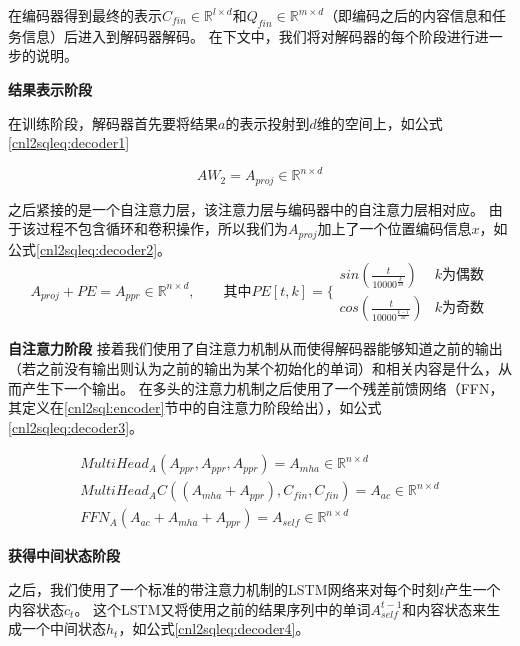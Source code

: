 在编码器得到最终的表示$C_{fin} \in \mathbb{R}^{l \times d}$和$Q_{fin} \in \mathbb{R}^{m \times d}$（即编码之后的内容信息和任务信息）后进入到解码器解码。
在下文中，我们将对解码器的每个阶段进行进一步的说明。

\textbf{结果表示阶段}

在训练阶段，解码器首先要将结果$a$的表示投射到$d$维的空间上，如公式\ref{cnl2sqleq:decoder1}

\begin{equation}
  \label{cnl2sqleq:decoder1}
  AW_2 = A_{proj} \in \mathbb{R}^{n \times d} 
\end{equation}

之后紧接的是一个自注意力层，该注意力层与编码器中的自注意力层相对应。
由于该过程不包含循环和卷积操作，所以我们为$A_{proj}$加上了一个位置编码信息$x$，如公式\ref{cnl2sqleq:decoder2}。
\begin{equation}
  \label{cnl2sqleq:decoder2}
  A_{proj} + PE = A_{ppr} \in \mathbb{R}^{n \times d},\qquad \mbox{其中} PE[t,k] = \{   
  \begin{array}{lr}
    sin(\frac{t}{10000^{\frac{k}{2d}}}) &  k\mbox{为偶数}\\
    cos(\frac{t}{10000^{\frac{k-1}{2d}}}) &  k\mbox{为奇数}
  \end{array}
\end{equation}

\textbf{自注意力阶段}
接着我们使用了自注意力机制\cite{vaswani2017attention}从而使得解码器能够知道之前的输出（若之前没有输出则认为之前的输出为某个初始化的单词）和相关内容是什么，从而产生下一个输出。
在多头的注意力机制之后使用了一个残差前馈网络（FFN，其定义在\ref{cnl2sql:encoder}节中的自注意力阶段给出），如公式\ref{cnl2sqleq:decoder3}。

\begin{gather}
  \label{cnl2sqleq:decoder3}
  MultiHead_A(A_{ppr},A_{ppr},A_{ppr}) = A_{mha} \in \mathbb{R}^{n \times d}\\
  MultiHead_{A}C((A_{mha} + A_{ppr}),C_{fin},C_{fin}) = A_{ac} \in \mathbb{R}^{n \times d}\\
  FFN_A(A_{ac} + A_{mha} + A_{ppr}) = A_{self} \in \mathbb{R}^{n \times d}
\end{gather}

\textbf{获得中间状态阶段}

之后，我们使用了一个标准的带注意力机制的LSTM网络来对每个时刻$t$产生一个内容状态$\widetilde{c}_t$。
这个LSTM又将使用之前的结果序列中的单词$A^{t-1}_{self}$和内容状态来生成一个中间状态$h_t$，如公式\ref{cnl2sqleq:decoder4}。

